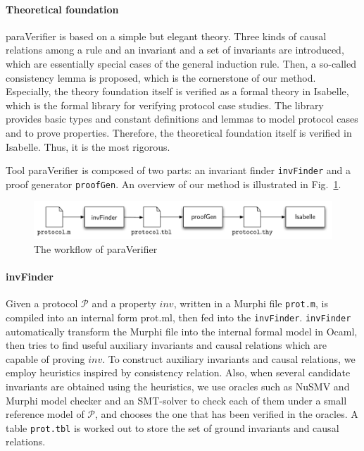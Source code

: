 \documentclass{llncs}
\begin{document}
\paragraph{Theoretical foundation}  {\sf paraVerifier} is based on a simple but elegant theory.  Three kinds of causal
relations among a rule and an invariant and a set of invariants are introduced, which are
essentially special cases of the general induction rule. Then, a
so-called consistency lemma is proposed, which is the cornerstone of 
our method. Especially, the theory foundation itself is  verified as a
formal theory in Isabelle, which is the formal library for verifying protocol case studies. The library provides basic types and constant definitions  and lemmas to model protocol cases and to prove  properties.  Therefore, the theoretical foundation itself is verified in Isabelle. Thus, it is the most rigorous.

Tool {\sf paraVerifier} is composed of two parts:  an invariant finder {\tt invFinder}
and a proof generator {\tt proofGen}. An overview of our method is  illustrated in Fig.~\ref{fig:arch}.


\begin{figure}[htbp]
\centering %
\includegraphics[width=1\textwidth]{paraVerifier.pdf}
\vspace{-0.6cm}
\caption{The workflow of {\sf paraVerifier} \label{fig:arch}
}
\end{figure}

\paragraph{invFinder}%
Given a protocol $\mathcal{P}$ and a property $inv$,  written in
a Murphi  file {\tt prot.m}, is compiled into an internal form {\sf prot.ml}, then fed into the
\texttt{invFinder}. {\tt invFinder} automatically transform the Murphi file into the internal formal model in Ocaml, then tries to find useful auxiliary invariants and causal relations which are capable of proving $inv$. To construct auxiliary invariants and causal relations, we employ heuristics inspired by consistency relation. Also, when several candidate invariants are obtained using the heuristics, we use oracles such as NuSMV and Murphi model checker and an SMT-solver to check each of them under a small reference model of $\mathcal{P}$, and chooses the one that has been verified in the oracles. A table {\tt prot.tbl} is worked out  to store the set of ground invariants and
 causal relations.
\end{document}

